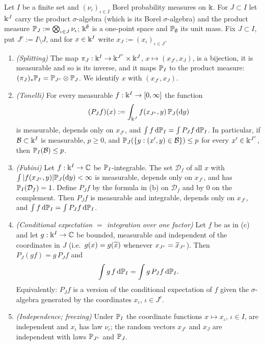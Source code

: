 \begin{lemma}\label{lem:split}
Let $I$ be a finite set and $(\nu_\iota)_{\iota\in I}$ Borel probability measures on $\Bbbk$. For $J\subset I$ let $\Bbbk^J$ carry the product $\sigma$-algebra (which is its Borel $\sigma$-algebra) and the product measure $\mathbb{P}_J:=\bigotimes_{\iota\in J}\nu_\iota$;
$\Bbbk^\emptyset$ is a one-point space and $\mathbb{P}_\emptyset$ its unit mass. Fix $J\subset I$, put $J^c:=I\setminus J$, and for $x\in\Bbbk^I$ write $x_J:=(x_\iota)_{\iota\in J}$.
\begin{enumerate}[label=\textup{(\alph*)},leftmargin=2.2em,itemsep=1pt]
\item \emph{(Splitting)} The map $\pi_J:\Bbbk^I\to\Bbbk^{J^c}\times\Bbbk^J$, $x\mapsto(x_{J^c},x_J)$, is a bijection, it is measurable and so is its inverse, and it maps $\mathbb{P}_I$ to the product measure: $(\pi_J)_*\mathbb{P}_I=\mathbb{P}_{J^c}\otimes\mathbb{P}_J$.
We identify $x$ with $(x_{J^c},x_J)$.
\item \emph{(Tonelli)} For every measurable $f:\Bbbk^I\to[0,\infty]$ the function
\[
 (P_Jf)(x):=\int_{\Bbbk^J}f(x_{J^c},y)\,\mathbb{P}_J(\mathrm{d} y)
\]
is measurable, depends only on $x_{J^c}$, and $\int f\,\mathrm{d}\mathbb{P}_I=\int P_Jf\,\mathrm{d}\mathbb{P}_I$. In particular, if $\mathcal B\subset\Bbbk^I$ is measurable, $p\ge0$, and $\mathbb{P}_J(\{y:(x',y)\in\mathcal B\})\le p$ for every $x'\in\Bbbk^{J^c}$, then $\mathbb{P}_I(\mathcal B)\le p$.
\item \emph{(Fubini)} Let $f:\Bbbk^I\to\mathbb{C}$ be $\mathbb{P}_I$-integrable. The set $\mathcal D_f$ of all $x$ with $\int|f(x_{J^c},y)|\mathbb{P}_J(\mathrm{d} y)<\infty$ is measurable, depends only on $x_{J^c}$, and has $\mathbb{P}_I(\mathcal D_f)=1$.
Define $P_Jf$ by the formula in \textup{(b)} on $\mathcal D_f$ and by $0$ on the complement. Then $P_Jf$ is measurable and integrable, depends only on $x_{J^c}$, and $\int f\,\mathrm{d}\mathbb{P}_I=\int P_Jf\,\mathrm{d}\mathbb{P}_I$.
\item \emph{(Conditional expectation $=$ integration over one factor)} Let $f$ be as in \textup{(c)} and let $g:\Bbbk^I\to\mathbb{C}$ be bounded, measurable and independent of the coordinates in $J$ (i.e.\ $g(x)=g(\widetilde x)$ whenever $x_{J^c}=\widetilde x_{J^c}$). Then
$P_J(gf)=g\,P_Jf$ and
\[
 \int g\,f\,\mathrm{d}\mathbb{P}_I=\int g\,P_Jf\,\mathrm{d}\mathbb{P}_I .
\]
Equivalently: $P_Jf$ is a version of the conditional expectation of $f$ given the $\sigma$-algebra generated by the coordinates $x_\iota$, $\iota\in J^c$.
\item \emph{(Independence; freezing)} Under $\mathbb{P}_I$ the coordinate functions $x\mapsto x_\iota$, $\iota\in I$, are independent and $x_\iota$ has law $\nu_\iota$; the random vectors $x_{J^c}$ and $x_J$ are independent with laws $\mathbb{P}_{J^c}$ and $\mathbb{P}_J$.

\end{enumerate}
\end{lemma}
